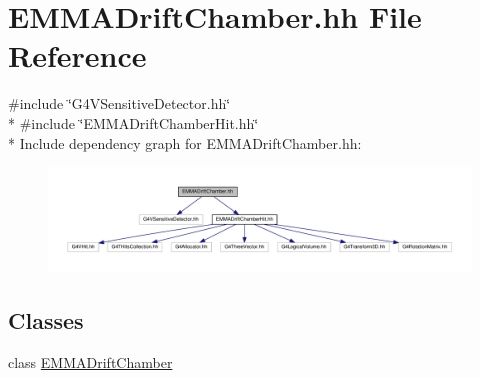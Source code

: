 \hypertarget{EMMADriftChamber_8hh}{}\section{E\+M\+M\+A\+Drift\+Chamber.\+hh File Reference}
\label{EMMADriftChamber_8hh}
{\ttfamily \#include \char`\"{}G4\+V\+Sensitive\+Detector.\+hh\char`\"{}}\\*
{\ttfamily \#include \char`\"{}E\+M\+M\+A\+Drift\+Chamber\+Hit.\+hh\char`\"{}}\\*
Include dependency graph for E\+M\+M\+A\+Drift\+Chamber.\+hh\+:
\nopagebreak
\begin{figure}[H]
\begin{center}
\leavevmode
\includegraphics[width=350pt]{EMMADriftChamber_8hh__incl}
\end{center}
\end{figure}
\subsection*{Classes}
\begin{DoxyCompactItemize}
\item 
class \hyperlink{classEMMADriftChamber}{E\+M\+M\+A\+Drift\+Chamber}
\end{DoxyCompactItemize}
